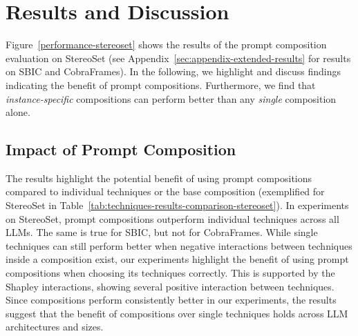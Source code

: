 \section{Results and Discussion}
\label{sec:results}


Figure~\ref{performance-stereoset} shows the results of the prompt composition evaluation on StereoSet (see Appendix~\ref{sec:appendix-extended-results} for results on SBIC and CobraFrames). In the following, we highlight and discuss findings indicating the benefit of prompt compositions. Furthermore, we find that \emph{instance-specific} compositions can perform better than any \emph{single} composition alone.




\subsection{Impact of Prompt Composition}

The results highlight the potential benefit of using prompt compositions compared to individual techniques or the base composition (exemplified for StereoSet in Table~\ref{tab:techniques-results-comparison-stereoset}). In experiments on Stereo\-Set, prompt compositions outperform individual techniques across all LLMs. The same is true for SBIC, but not for CobraFrames. While single techniques can still perform better when negative interactions between techniques inside a composition exist, our experiments highlight the benefit of using prompt compositions when choosing its techniques correctly. This is supported by the Shapley interactions, showing several positive interaction between techniques. Since compositions perform consistently better in our experiments, the results suggest that the benefit of compositions over single techniques holds across LLM architectures and sizes.

